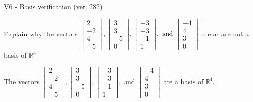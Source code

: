 \begin{exercise}
  \begin{exerciseTitle}V6 - Basis verification (ver. 282)\end{exerciseTitle}
  \begin{exerciseStatement}
    Explain why the vectors \(\left[\begin{array}{r}
2 \\
-2 \\
4 \\
-5
\end{array}\right] , \left[\begin{array}{r}
3 \\
3 \\
-5 \\
0
\end{array}\right] , \left[\begin{array}{r}
-3 \\
-3 \\
-1 \\
1
\end{array}\right] , \text{ and } \left[\begin{array}{r}
-4 \\
4 \\
3 \\
0
\end{array}\right]\) are or are not a basis of \(\mathbb{R}^4\)	


  \end{exerciseStatement}
  \begin{exerciseAnswer}
   The vectors \(\left[\begin{array}{r}
2 \\
-2 \\
4 \\
-5
\end{array}\right] , \left[\begin{array}{r}
3 \\
3 \\
-5 \\
0
\end{array}\right] , \left[\begin{array}{r}
-3 \\
-3 \\
-1 \\
1
\end{array}\right] , \text{ and } \left[\begin{array}{r}
-4 \\
4 \\
3 \\
0
\end{array}\right]\) 
  	 are  a basis of \(\mathbb{R}^4\).
  


  \end{exerciseAnswer}
\end{exercise}